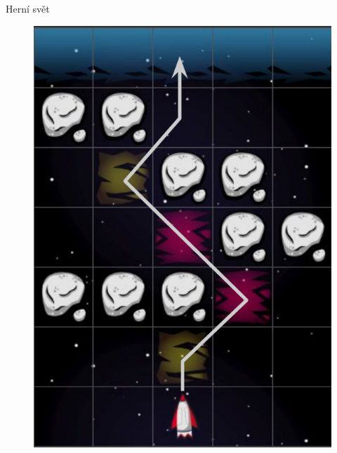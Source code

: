 \documentclass[
]{beamer}
\begin{document}
\begin{frame}{Herní svět}
\begin{figure}
\includegraphics[width=\textwidth,height=.65\textheight,keepaspectratio]{../img/spaceworld-path}
\end{figure}
\end{frame}
\end{document}

